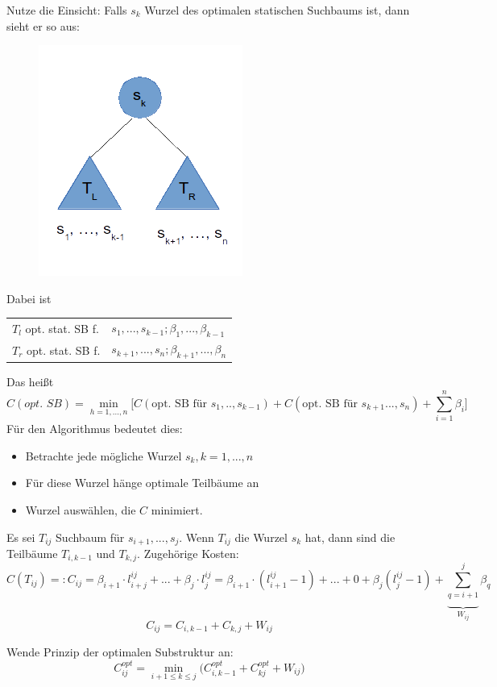 \documentclass[fleqn]{scrartcl}
\begin{document}
Nutze die Einsicht: Falls $s_k$ Wurzel des optimalen statischen Suchbaums ist, dann sieht er so aus:
\begin{figure}[htbp]
\centering
\includegraphics[scale=0.75]{optimalerSuchteilbaum2.png}
\end{figure}
Dabei ist \\
\begin{tabular} {l l}
$T_l$ opt. stat. SB f. & $s_1, ..., s_{k-1}; \beta_1, ..., \beta_{k-1}$\\
$T_r$ opt. stat. SB f. & $s_{k+1}, ..., s_n; \beta_{k+1}, ..., \beta_n$
\end{tabular}
Das heißt 
\[C (opt. \,\, SB) = \min_{h = 1, ..., n} \bigg[C(\text{opt. SB für } s_1, .., s_{k-1}) + C (\text{opt. SB für } s_{k+1} ..., s_n) + \sum\limits_{i = 1}^{n} \beta_i\bigg]\]
Für den Algorithmus bedeutet dies:
\begin{itemize}
\item Betrachte jede mögliche Wurzel $s_k, k = 1, ..., n$
\item Für diese Wurzel hänge optimale Teilbäume an
\item Wurzel auswählen, die $C$ minimiert.
\end{itemize}

Es sei $T_{ij}$ Suchbaum für $s_{i+1} , ..., s_j$. Wenn $T_{ij}$ die Wurzel $s_k$ hat, dann sind die Teilbäume $T_{i, k-1}$ und $T_{k, j}$.
Zugehörige Kosten: \[C(T_{ij}) =: C_{ij} = \beta_{i+1} \cdot l_{i+j}^{ij} + ... + \beta_j \cdot l_j^{ij} = \beta_{i+1} \cdot (l_{i+1}^{ij} - 1) + ... + 0 + \beta_j (l_j^{ij} - 1) + \underbrace{\sum\limits_{q = i+1}^{j}}_{W_{ij}} \beta_q\]
\[C_{ij} = C_{i, k-1} + C_{k, j} + W_{i j}\]

Wende Prinzip der optimalen Substruktur an:
\[C_{ij}^{opt} = \min_{i + 1 \leq k \leq j} \bigg(C_{i, k-1}^{opt} + C_{kj}^{opt} + W_{ij} \bigg) \]
\end{document}
